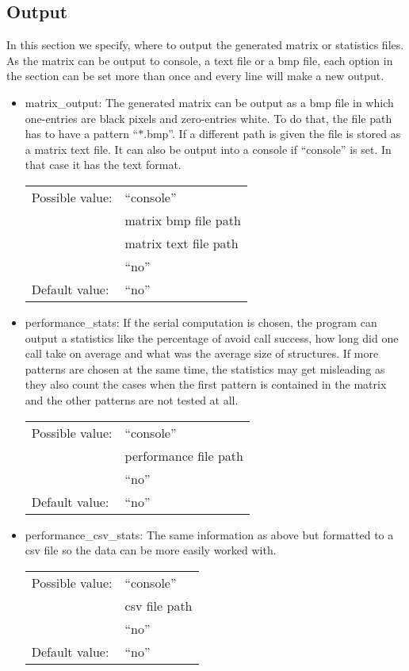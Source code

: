 \subsection{Output}
In this section we specify, where to output the generated matrix or statistics files. As the matrix can be output to console, a text file or a bmp file, each option in the section can be set more than once and every line will make a new output.
\begin{itemize}
\item matrix\_output: The generated matrix can be output as a bmp file in which one-entries are black pixels and zero-entries white. To do that, the file path has to have a pattern ``$\ast$.bmp''. If a different path is given the file is stored as a matrix text file. It can also be output into a console if ``console'' is set. In that case it has the text format.

\begin{tabular}{ll}
Possible value: & ``console'' \\
& matrix bmp file path \\
& matrix text file path \\
& ``no'' \\
Default value: & ``no''
\end{tabular}

\item performance\_stats: If the serial computation is chosen, the program can output a statistics like the percentage of avoid call success, how long did one call take on average and what was the average size of structures. If more patterns are chosen at the same time, the statistics may get misleading as they also count the cases when the first pattern is contained in the matrix and the other patterns are not tested at all.

\begin{tabular}{ll}
Possible value: & ``console'' \\
& performance file path \\
& ``no'' \\
Default value: & ``no''
\end{tabular}

\item performance\_csv\_stats: The same information as above but formatted to a csv file so the data can be more easily worked with.

\begin{tabular}{ll}
Possible value: & ``console'' \\
& csv file path \\
& ``no'' \\
Default value: & ``no''
\end{tabular}


\end{itemize}

